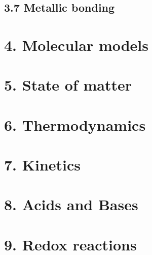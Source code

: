 \documentclass{cheatsheet}
\begin{document}
	\subsection{3.7 Metallic bonding}
	
	

\section{4. Molecular models}
	

\section{5. State of matter} %
	

\section{6. Thermodynamics}
	

\section{7. Kinetics}
	

\section{8. Acids and Bases}
	

\section{9. Redox reactions}
	
\end{document}
